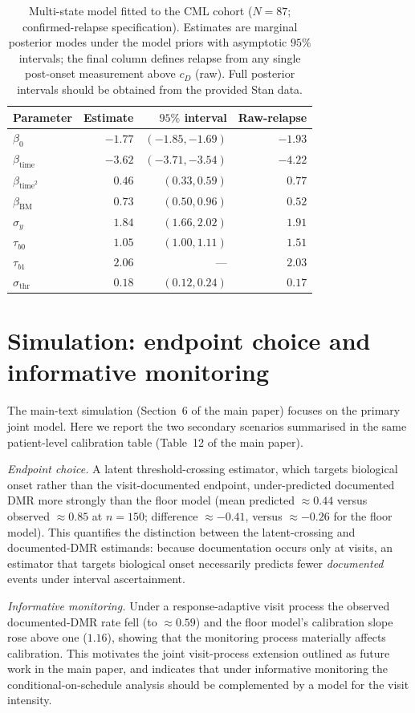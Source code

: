\documentclass[11pt]{article}
\begin{document}
\begin{table}[!htbp]
\centering
\caption{Multi-state model fitted to the CML cohort ($N=87$; confirmed-relapse specification). Estimates are marginal posterior modes under the model priors with asymptotic $95\%$ intervals; the final column defines relapse from any single post-onset measurement above $c_D$ (raw). Full posterior intervals should be obtained from the provided Stan data.}
\label{tab:ms-real}
\small
\begin{tabular}{lrrr}
\toprule
Parameter & Estimate & $95\%$ interval & Raw-relapse\\
\midrule
$\beta_0$ & $-1.77$ & $(-1.85,-1.69)$ & $-1.93$\\
$\beta_{\mathrm{time}}$ & $-3.62$ & $(-3.71,-3.54)$ & $-4.22$\\
$\beta_{\mathrm{time}^2}$ & $0.46$ & $(0.33,0.59)$ & $0.77$\\
$\beta_{\mathrm{BM}}$ & $0.73$ & $(0.50,0.96)$ & $0.52$\\
$\sigma_y$ & $1.84$ & $(1.66,2.02)$ & $1.91$\\
$\tau_{b0}$ & $1.05$ & $(1.00,1.11)$ & $1.51$\\
$\tau_{b1}$ & $2.06$ & --- & $2.03$\\
$\sigma_{\mathrm{thr}}$ & $0.18$ & $(0.12,0.24)$ & $0.17$\\
\bottomrule
\end{tabular}
\end{table}


\section{Simulation: endpoint choice and informative monitoring}
\label{sec:s5-sim}

The main-text simulation (Section~6 of the main paper) focuses on the primary
joint model. Here we report the two secondary scenarios summarised in the same
patient-level calibration table (Table~12 of the main paper).

\emph{Endpoint choice.} A latent threshold-crossing estimator, which targets
biological onset rather than the visit-documented endpoint, under-predicted
documented DMR more strongly than the floor model (mean predicted
$\approx0.44$ versus observed $\approx0.85$ at $n=150$; difference
$\approx-0.41$, versus $\approx-0.26$ for the floor model). This quantifies the
distinction between the latent-crossing and documented-DMR estimands: because
documentation occurs only at visits, an estimator that targets biological onset
necessarily predicts fewer \emph{documented} events under interval
ascertainment.

\emph{Informative monitoring.} Under a response-adaptive visit process the
observed documented-DMR rate fell (to $\approx0.59$) and the floor model's
calibration slope rose above one ($1.16$), showing that the monitoring process
materially affects calibration. This motivates the joint visit-process
extension outlined as future work in the main paper, and indicates that under
informative monitoring the conditional-on-schedule analysis should be
complemented by a model for the visit intensity.




\end{document}
